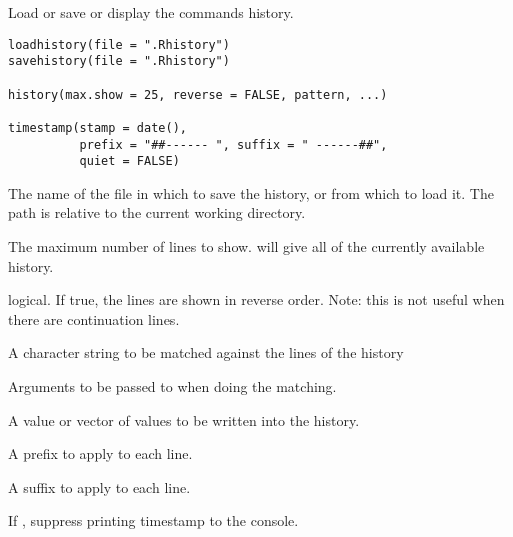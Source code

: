 %
\begin{Description}\relax
Load or save or display the commands history.
\end{Description}
%
\begin{Usage}
\begin{verbatim}
loadhistory(file = ".Rhistory")
savehistory(file = ".Rhistory")

history(max.show = 25, reverse = FALSE, pattern, ...)

timestamp(stamp = date(),
          prefix = "##------ ", suffix = " ------##",
          quiet = FALSE)
\end{verbatim}
\end{Usage}
%
\begin{Arguments}
\begin{ldescription}
\item[\code{file}] The name of the file in which to save the history, or
from which to load it. The path is relative to the current
working directory.
\item[\code{max.show}] The maximum number of lines to show.  will
give all of the currently available history.
\item[\code{reverse}] logical. If true, the lines are shown in reverse
order. Note: this is not useful when there are continuation lines.
\item[\code{pattern}] A character string to be matched against the lines of
the history
\item[\code{...}] Arguments to be passed to  when doing
the matching.
\item[\code{stamp}] A value or vector of values to be written into the history.
\item[\code{prefix}] A prefix to apply to each line.
\item[\code{suffix}] A suffix to apply to each line.
\item[\code{quiet}] If , suppress printing timestamp to the console.
\end{ldescription}
\end{Arguments}
%
